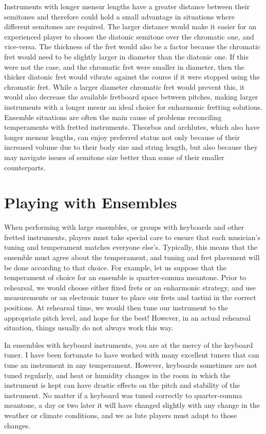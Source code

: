 Instruments with longer mensur lengths have a greater distance between their semitones and therefore
could hold a small advantage in situations where different semitones are required. The larger
distance would make it easier for an experienced player to choose the diatonic semitone over the
chromatic one, and vice-versa. The thickness of the fret would also be a factor because the
chromatic fret would need to be slightly larger in diameter than the diatonic one. If this were not
the case, and the chromatic fret were smaller in diameter, then the thicker diatonic fret would
vibrate against the course if it were stopped using the chromatic fret.  While a larger diameter
chromatic fret would prevent this, it would also decrease the available fretboard space between
pitches, making larger instruments with a longer mesur an ideal choice for
enharmonic fretting solutions.  Ensemble situations are often the main cause of
problems reconciling temperaments with fretted instruments.  Theorbos and archlutes, which also have longer mensur lengths,
can enjoy preferred status not only because of their increased volume due to their body size and
string length, but also because they may navigate issues of semitone size better than some of their
smaller counterparts.

\section{Playing with Ensembles}

When performing with large ensembles, or groups with keyboards and other fretted instruments,
players must take special care to ensure that each musician's tuning and temperament matches
everyone else's. Typically, this means that the ensemble must agree about the temperament, 
and tuning and fret placement will be done according to that choice.  For example,
let us suppose that the temperament of choice for an ensemble is quarter-comma meantone.  Prior to
rehearsal, we would choose either fixed frets or an enharmonic strategy, and use measurements or an
electronic tuner to place our frets and tastini in the correct positions.  At rehearsal time, we
would then tune our instrument to the appropriate pitch level, and hope for the best!  However, in
an actual rehearsal situation, things usually do not always work this way.

In ensembles with keyboard instruments, you are at the mercy of the keyboard tuner.
I have been fortunate to have worked with many excellent tuners that can tune an instrument in any
temperament.  However, keyboards sometimes are not tuned regularly, and heat or humidity changes in
the room in which the instrument is kept can have drastic effects on the pitch and stability of the
instrument.  No matter if a keyboard was tuned correctly to quarter-comma meantone, a day or two
later it will have changed slightly with any change in the weather or climate conditions, and we
as lute players must adapt to those changes.

